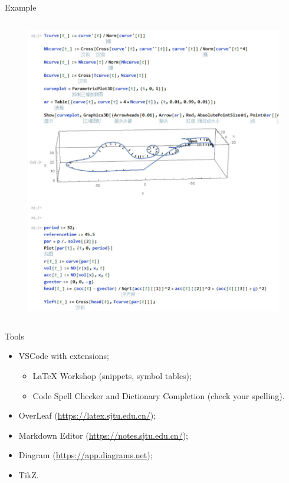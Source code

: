\documentclass{beamer}
\begin{document}
\begin{frame}{Example}
\begin{columns}
\begin{column}{0.5\linewidth}
\begin{figure}[htbp]
                \includegraphics[width=\textwidth]{img/code.jpg}
            \end{figure}
        \end{column}
    \end{columns}
\end{frame}

\begin{frame}{Tools}
    \begin{itemize}
        \item VSCode with extensions;
        \begin{itemize}
            \item LaTeX Workshop (snippets, symbol tables);
            \item Code Spell Checker and Dictionary Completion (check your spelling).
        \end{itemize}
        \item OverLeaf (\url{https://latex.sjtu.edu.cn/});
        \item Markdown Editor (\url{https://notes.sjtu.edu.cn/});
        \item Diagram (\url{https://app.diagrams.net});
        \item TikZ. 
    \end{itemize}
\end{frame}
\end{document}
